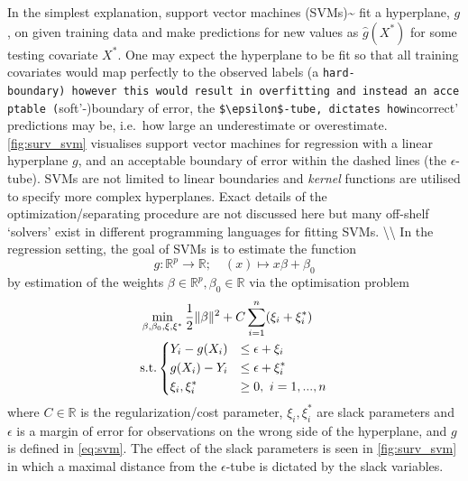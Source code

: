 \documentclass[
  letterpaper,
]{scrbook}
\theoremstyle{plain}
\theoremstyle{definition}
\theoremstyle{remark}
\begin{document}
In the simplest explanation, support vector machines
(SVMs)\textasciitilde{}\cite{CortesVapnik1995} fit a hyperplane, \(g\),
on given training data and make predictions for new values as
\(\hat{g}(X^*)\) for some testing covariate \(X^*\). One may expect the
hyperplane to be fit so that all training covariates would map perfectly
to the observed labels (a
\texttt{hard-boundary\textquotesingle{})\ however\ this\ would\ result\ in\ overfitting\ and\ instead\ an\ acceptable\ (}soft'-)boundary
of error, the
\texttt{\$\textbackslash{}epsilon\$-tube\textquotesingle{},\ dictates\ how}incorrect'
predictions may be, i.e.~how large an underestimate or overestimate.
\ref{fig:surv_svm} visualises support vector machines for regression
with a linear hyperplane \(g\), and an acceptable boundary of error
within the dashed lines (the \(\epsilon\)-tube). SVMs are not limited to
linear boundaries and \emph{kernel} functions are utilised to specify
more complex hyperplanes. Exact details of the optimization/separating
procedure are not discussed here but many off-shelf `solvers' exist in
different programming languages for fitting SVMs.
\textbackslash\textbackslash{} In the regression setting, the goal of
SVMs is to estimate the function \[
g: \mathbb{R}^p \rightarrow \mathbb{R}; \quad (x) \mapsto x\beta + \beta_0
\label{eq:svm}
\] by estimation of the weights
\(\beta \in \mathbb{R}^p, \beta_0 \in \mathbb{R}\) via the optimisation
problem \[
\begin{aligned}
& \min_{\beta,\beta_0, \xi, \xi^*} \frac{1}{2} \|\beta\|^2 + C \sum^n_{i=1}(\xi_i + \xi_i^*) \\
& \textrm{s.t.}
\begin{dcases}
Y_i - g(X_i) & \leq \epsilon + \xi_i \\
g(X_i) - Y_i & \leq \epsilon + \xi_i^* \\
\xi_i, \xi_i^* & \geq 0, \ i = 1,...,n
\end{dcases}
\end{aligned}
\label{eq:svm_opt}
\] where \(C \in \mathbb{R}\) is the regularization/cost parameter,
\(\xi_i,\xi_i^*\) are slack parameters and \(\epsilon\) is a margin of
error for observations on the wrong side of the hyperplane, and \(g\) is
defined in \ref{eq:svm}. The effect of the slack parameters is seen in
\ref{fig:surv_svm} in which a maximal distance from the
\(\epsilon\)-tube is dictated by the slack variables.
\end{document}
